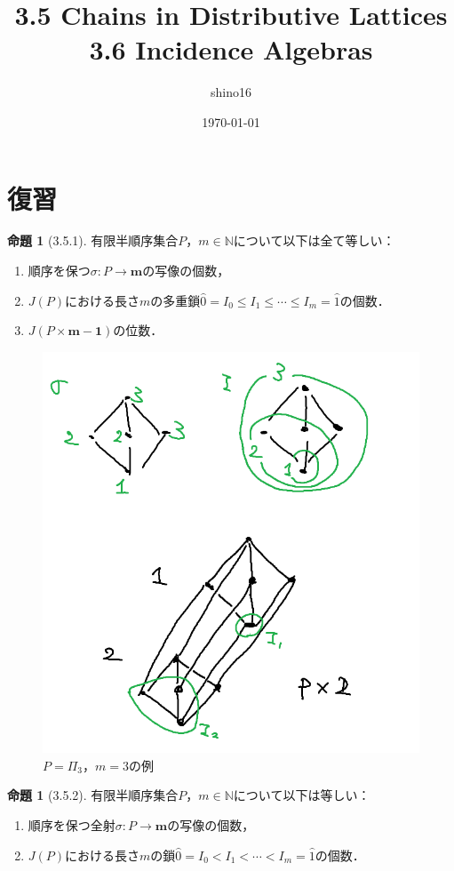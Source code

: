 \documentclass[xelatex,ja=standard,a4paper,14pt,everyparhook=compat]{bxjsarticle}
\title{3.5 Chains in Distributive Lattices \\ 3.6 Incidence Algebras}
\author{shino16}
\date{\today}
\newcommand{\bbN}{\mathbb{N}}
\theoremstyle{definition}
\newtheorem{proposition}[theorem]{命題}
\newtheorem*{proposition*}{命題}
\begin{document}
\begin{titlepage}
    \maketitle
    \tableofcontents
\end{titlepage}

\setcounter{section}{-1}
\section{復習}

\begin{proposition*}[3.5.1]
    有限半順序集合$P$，$m \in \bbN$について以下は全て等しい： \begin{enumerate}
        \item 順序を保つ$\sigma: P \to \bm{m}$の写像の個数，
        \item $J(P)$における長さ$m$の多重鎖$\hat 0 = I_0 \leq I_1 \leq \cdots \leq I_m = \hat 1$の個数．
        \item $J(P \times \bm{m-1})$の位数．
    \end{enumerate}
\end{proposition*}
\begin{figure}[h]
    \centering
    \includegraphics[width=0.7  \textwidth]{Prop3.5.1.png}
    \caption{$P = \Pi_3$，$m = 3$の例}
\end{figure}

\newpage

\begin{proposition}[3.5.2] \label{3.5.2}
    有限半順序集合$P$，$m \in \bbN$について以下は等しい： \begin{enumerate}
        \item 順序を保つ全射$\sigma: P \to \bm{m}$の写像の個数，
        \item $J(P)$における長さ$m$の鎖$\hat 0 = I_0 < I_1 < \cdots < I_m = \hat 1$の個数．
    \end{enumerate}
\end{proposition}
\end{document}
